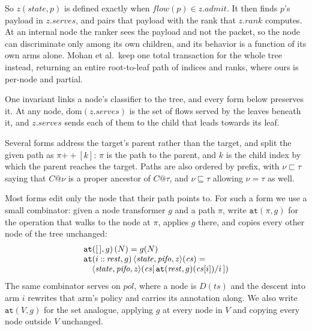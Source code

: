 \documentclass[sigplan,anonymous,review,nonacm]{acmart}
\newcommand{\notation}[1]{\ensuremath{#1}\ifmmode\else\xspace\fi}
\newcommand{\pol}{\notation{\mathit{pol}}}
\begin{document}
So \(\mathit{z}(\mathit{state}, p)\) is defined exactly when \(\mathit{flow}(p) \in \mathit{z}.\mathit{admit}\).
It then finds \(p\)'s payload in \(\mathit{z}.\mathit{serves}\), and pairs that payload with the rank that \(\mathit{z}.\mathit{rank}\) computes.
At an internal node the ranker sees the payload and not the packet, so the node can discriminate only among its own children, and its behavior is a function of its own arms alone.
Mohan et al.\ keep one total transaction for the whole tree instead, returning an entire root-to-leaf path of indices and ranks, where ours is per-node and partial.

One invariant links a node's classifier to the tree, and every form below preserves it.
At any node, \(\mathrm{dom}(\mathit{z}.\mathit{serves})\) is the set of flows served by the leaves beneath it, and \(\mathit{z}.\mathit{serves}\) sends each of them to the child that leads towards its leaf.

Several forms address the target's parent rather than the target, and split the given path as \(\pi \mathbin{+\!\!+} [k]\): \(\pi\) is the path to the parent, and \(k\) is the child index by which the parent reaches the target.
Paths are also ordered by prefix, with \(\nu \sqsubset \tau\) saying that \(C@\nu\) is a proper ancestor of \(C@\tau\), and \(\nu \sqsubseteq \tau\) allowing \(\nu = \tau\) as well.

Most forms edit only the node that their path points to.
For such a form we use a small combinator: given a node transformer \(g\) and a path \(\pi\), write \(\mathtt{at}(\pi, g)\) for the operation that walks to the node at \(\pi\), applies \(g\) there, and copies every other node of the tree unchanged:
\[
\begin{array}{@{}l@{}}
\mathtt{at}([\,], g)\,(N) = g(N)\\
\mathtt{at}(i \mathbin{::} \mathit{rest}, g)\,\langle\mathit{state},\mathit{pifo},\mathit{z}\rangle(\mathit{cs}) =\\
\quad \langle\mathit{state},\mathit{pifo},\mathit{z}\rangle(\mathit{cs}[\,\mathtt{at}(\mathit{rest}, g)(\mathit{cs}[i]) / i\,])
\end{array}
\]
The same combinator serves on \pol, where a node is \(D(\mathit{ts})\) and the descent into arm \(i\) rewrites that arm's policy and carries its annotation along.
We also write \(\mathtt{at}(V, g)\) for the set analogue, applying \(g\) at every node in \(V\) and copying every node outside \(V\) unchanged.
\end{document}

